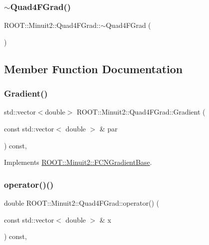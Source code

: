 \subsubsection{\texorpdfstring{$\sim$Quad4FGrad()}{~Quad4FGrad()}}
{\footnotesize\ttfamily R\+O\+O\+T\+::\+Minuit2\+::\+Quad4\+F\+Grad\+::$\sim$\+Quad4\+F\+Grad (\begin{DoxyParamCaption}{ }\end{DoxyParamCaption})\hspace{0.3cm}{\ttfamily [inline]}}



\subsection{Member Function Documentation}
\mbox{\label{classROOT_1_1Minuit2_1_1Quad4FGrad_afd3b64a4236e31bdf9c330e33ac7ac89}} 
\subsubsection{\texorpdfstring{Gradient()}{Gradient()}}
{\footnotesize\ttfamily std\+::vector$<$double$>$ R\+O\+O\+T\+::\+Minuit2\+::\+Quad4\+F\+Grad\+::\+Gradient (\begin{DoxyParamCaption}\item[{const std\+::vector$<$ double $>$ \&}]{par }\end{DoxyParamCaption}) const\hspace{0.3cm}{\ttfamily [inline]}, {\ttfamily [virtual]}}



Implements \mbox{\hyperlink{classROOT_1_1Minuit2_1_1FCNGradientBase_a004740e7e25a1358aafde6694196ef88}{R\+O\+O\+T\+::\+Minuit2\+::\+F\+C\+N\+Gradient\+Base}}.

\mbox{\label{classROOT_1_1Minuit2_1_1Quad4FGrad_a8aaafaa9d7f974e27f5b54b30289dd6d}} 
\subsubsection{\texorpdfstring{operator()()}{operator()()}}
{\footnotesize\ttfamily double R\+O\+O\+T\+::\+Minuit2\+::\+Quad4\+F\+Grad\+::operator() (\begin{DoxyParamCaption}\item[{const std\+::vector$<$ double $>$ \&}]{x }\end{DoxyParamCaption}) const\hspace{0.3cm}{\ttfamily [inline]}, {\ttfamily [virtual]}}


